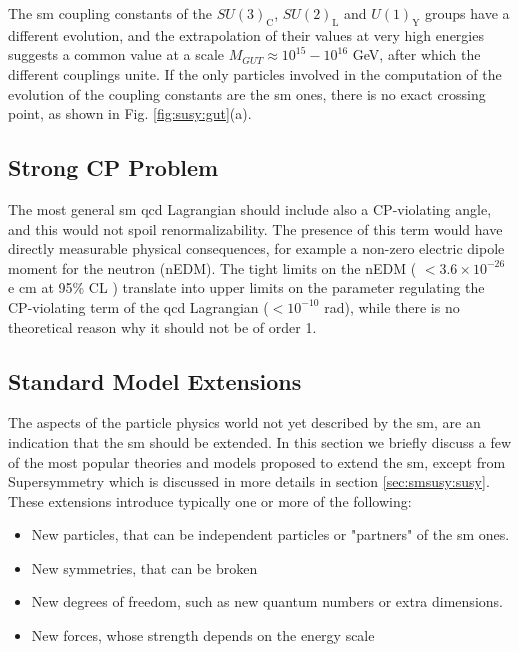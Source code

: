 The \gls{sm} coupling constants of the $SU(3)_\mathrm{C}$, $SU(2)_\mathrm{L}$ and $U(1)_\mathrm{Y}$ groups have a different evolution, and the extrapolation of their values at very high energies suggests a common value at a scale $M_{GUT} \approx 10^{15}-10^{16}$ GeV, after which the different couplings unite. If the only particles involved in the computation of the evolution of the coupling constants are the \gls{sm} ones, there is no exact crossing point, as shown in Fig. \ref{fig:susy:gut}(a).

\subsection*{Strong CP Problem}

The most general \gls{sm} \gls{qcd} Lagrangian should include also a CP-violating angle, and this would not spoil renormalizability. The presence of this term would have directly measurable physical consequences, for example a non-zero electric dipole moment for the neutron (nEDM). The tight  limits on the nEDM ( $< 3.6 \times 10^{-26}$ e cm at 95\% CL \cite{PhysRevD.92.092003}) translate into upper limits on the parameter regulating the CP-violating term of the \gls{qcd} Lagrangian ($< 10^{-10}$ rad), while there is no theoretical reason why it should not be of order 1. 


\subsection{Standard Model Extensions}
\label{sec:sm:extensions}

The aspects of the particle physics world not yet described by the \gls{sm}, are an indication that the \gls{sm} should be extended.
In this section we briefly discuss a few of the most popular theories and models proposed to extend the \gls{sm}, except from Supersymmetry which is discussed in more details in section \ref{sec:smsusy:susy}. These extensions introduce typically one or more of the following:

\begin{itemize}
\item New particles, that can be independent particles or "partners" of the \gls{sm} ones.
\item New symmetries, that can be broken 
\item New degrees of freedom, such as new quantum numbers or extra dimensions.
\item New forces, whose strength depends on the energy scale
\end{itemize}

